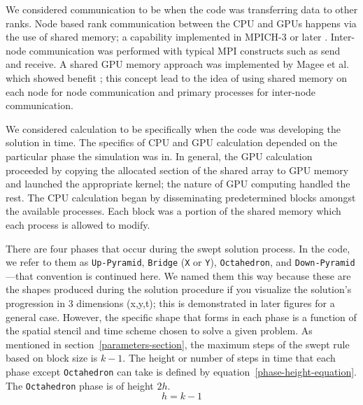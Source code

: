 \documentclass[preprints,article,accept,moreauthors,pdftex]{Definitions/mdpi}
\def\Up{\texttt{Up-Pyramid}}
\def\Down{\texttt{Down-Pyramid}}
\def\Oct{\texttt{Octahedron}}
\begin{document}
\par
 We considered communication to be when the code was transferring data to other ranks. Node based rank communication between the CPU and GPUs happens via the use of shared memory; a capability implemented in MPICH-3 or later \cite{Hoefler2013MPIMemory}. Inter-node communication was performed with typical MPI constructs such as send and receive. A shared GPU memory approach was implemented by Magee et al. which showed benefit \cite{Magee2018AcceleratingDecomposition}; this concept lead to the idea of using shared memory on each node for node communication and primary processes for inter-node communication.
 
 \par
 We considered calculation to be specifically when the code was developing the solution in time. The specifics of CPU and GPU calculation depended on the particular phase the simulation was in. In general, the GPU calculation proceeded by copying the allocated section of the shared array to GPU memory and launched the appropriate kernel; the nature of GPU computing handled the rest. The CPU calculation began by disseminating predetermined blocks amongst the available processes. Each block was a portion of the shared memory which each process is allowed to modify.
 
\par
There are four phases that occur during the swept solution process. In the code, we refer to them as \Up{}, \texttt{Bridge} (\texttt{X} or \texttt{Y}), \Oct{}, and \Down{}---that convention is continued here. We named them this way because these are the shapes produced during the solution procedure if you visualize the solution's progression in 3 dimensions (x,y,t); this is demonstrated in later figures for a general case. However, the specific shape that forms in each phase is a function of the spatial stencil and time scheme chosen to solve a given problem. As mentioned in section~\ref{parameters-section}, the maximum steps of the swept rule based on block size is $k-1$. The height or number of steps in time that each phase except \Oct{} can take is defined by equation~\ref{phase-height-equation}. The \Oct{} phase is of height $2h$.
\begin{equation}
    \label{phase-height-equation}
    h=k-1
\end{equation}
 
\end{document}
